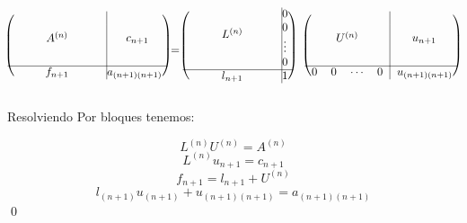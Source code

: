 \begin{itemize}
  \[
  \begin{blockarray}{cccc|c}
    \begin{block}{(cccc@{\hspace*{45pt}}|c@{\hspace*{5pt}})}
    \BAmulticolumn{4}{c|}{\multirow{4}{*}{$A^{(n)}$}}&\BAmulticolumn{1}{c}{\multirow{4}{*}{$c_{n+1}$}}\\
	&&&&\\
    &&&&\\
    &&&&\\
    \cline{1-5}%
    \BAmulticolumn{4}{c|}{f_{n+1}}&a_{(n+1)(n+1)} \\
    \end{block}
  \end{blockarray}
  =
  \begin{blockarray}{cccc|c}
    \begin{block}{(cccc@{\hspace*{45pt}}|c@{\hspace*{5pt}})}
    \BAmulticolumn{4}{c|}{\multirow{4}{*}{$L^{(n)}$}}&0 \\
	&&&& 0\\
    &&&& \vdots\\
    &&&& 0\\
    \cline{1-5}%
    \BAmulticolumn{4}{c|}{l_{n+1}}& 1 \\
    \end{block}
  \end{blockarray}
  \hspace{1em}
  \begin{blockarray}{cccc|c}
    \begin{block}{(cccc|c@{\hspace*{5pt}})}
    \BAmulticolumn{4}{c|}{\multirow{4}{*}{$U^{(n)}$}}&\BAmulticolumn{1}{c}{\multirow{4}{*}{$u_{n+1}$}}\\
	&&&&\\
    &&&&\\
    &&&&\\
    \cline{1-5}%
    0 & 0 & \cdots & 0 & u_{(n+1)(n+1)} \\
    \end{block}
  \end{blockarray}
  \]
  
  Resolviendo Por bloques tenemos:
  
  \[ L^{(n)} U^{(n)} = A^{(n)} \]
  \[ L^{(n)} u_{n+1} = c_{n+1} \]
  \[ f_{n+1} = l_{n+1} + U^{(n)} \]
  \[ l_{(n+1)} u_{(n+1)} + u_{(n+1)(n+1)} = a_{(n+1)(n+1)} \]
\qed

\end{itemize}

